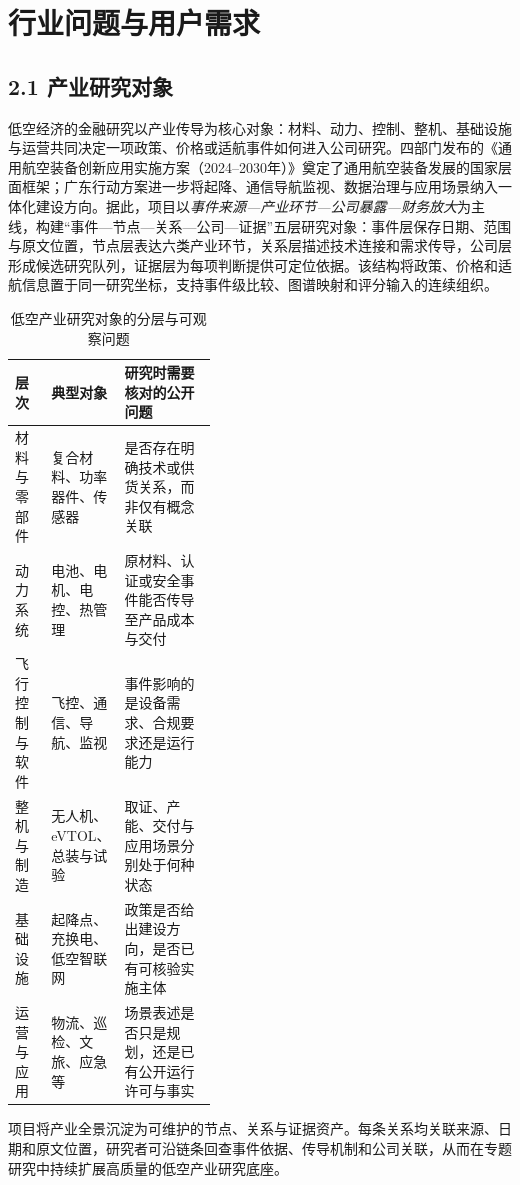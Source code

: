 \section{行业问题与用户需求}
\subsection*{2.1 产业研究对象}\label{page:05}

低空经济的金融研究以产业传导为核心对象：材料、动力、控制、整机、基础设施与运营共同决定一项政策、价格或适航事件如何进入公司研究。四部门发布的《通用航空装备创新应用实施方案（2024--2030年）》奠定了通用航空装备发展的国家层面框架\cite{wty-miit-plan}；广东行动方案进一步将起降、通信导航监视、数据治理与应用场景纳入一体化建设方向\cite{wty-gd-plan}。据此，项目以\emph{事件来源—产业环节—公司暴露—财务放大}为主线，构建“事件—节点—关系—公司—证据”五层研究对象：事件层保存日期、范围与原文位置，节点层表达六类产业环节，关系层描述技术连接和需求传导，公司层形成候选研究队列，证据层为每项判断提供可定位依据。该结构将政策、价格和适航信息置于同一研究坐标，支持事件级比较、图谱映射和评分输入的连续组织。

\begin{table}[!htbp]
\centering
\caption{低空产业研究对象的分层与可观察问题}
\label{tab:wty-industry-layers}
\small
\begin{tabularx}{\linewidth}{p{0.18\linewidth}p{0.22\linewidth}X}
\toprule
层次 & 典型对象 & 研究时需要核对的公开问题 \\
\midrule
材料与零部件 & 复合材料、功率器件、传感器 & 是否存在明确技术或供货关系，而非仅有概念关联 \\
动力系统 & 电池、电机、电控、热管理 & 原材料、认证或安全事件能否传导至产品成本与交付 \\
飞行控制与软件 & 飞控、通信、导航、监视 & 事件影响的是设备需求、合规要求还是运行能力 \\
整机与制造 & 无人机、eVTOL、总装与试验 & 取证、产能、交付与应用场景分别处于何种状态 \\
基础设施 & 起降点、充换电、低空智联网 & 政策是否给出建设方向，是否已有可核验实施主体 \\
运营与应用 & 物流、巡检、文旅、应急等 & 场景表述是否只是规划，还是已有公开运行许可与事实 \\
\bottomrule
\end{tabularx}
\end{table}

项目将产业全景沉淀为可维护的节点、关系与证据资产。每条关系均关联来源、日期和原文位置，研究者可沿链条回查事件依据、传导机制和公司关联，从而在专题研究中持续扩展高质量的低空产业研究底座。


